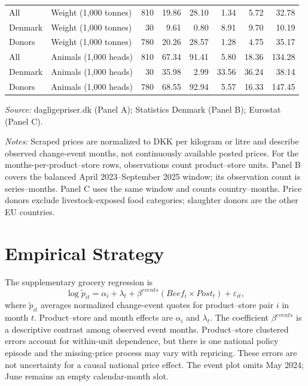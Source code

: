 \documentclass[11pt]{article}
\begin{document}
\begin{table}[htbp]
\begin{tabular}{llrrrrrr}
All & Weight (1,000 tonnes) & 810 & 19.86 & 28.10 & 1.34 & 5.72 & 32.78 \\
Denmark & Weight (1,000 tonnes) & 30 & 9.61 & 0.80 & 8.91 & 9.70 & 10.19 \\
Donors & Weight (1,000 tonnes) & 780 & 20.26 & 28.57 & 1.28 & 4.75 & 35.17 \\
All & Animals (1,000 heads) & 810 & 67.34 & 91.41 & 5.80 & 18.36 & 134.28 \\
Denmark & Animals (1,000 heads) & 30 & 35.98 & 2.99 & 33.56 & 36.24 & 38.14 \\
Donors & Animals (1,000 heads) & 780 & 68.55 & 92.94 & 5.57 & 16.33 & 147.45 \\\bottomrule
\end{tabular}
\begin{minipage}{0.98\linewidth}\small
\textit{Source:} dagligepriser.dk (Panel A); Statistics Denmark (Panel B); Eurostat (Panel C).\par
\textit{Notes:} Scraped prices are normalized to DKK per kilogram or litre and describe observed change-event months, not continuously available posted prices. For the months-per-product--store rows, observations count product--store units. Panel B covers the balanced April 2023--September 2025 window; its observation count is series--months. Panel C uses the same window and counts country--months. Price donors exclude livestock-exposed food categories; slaughter donors are the other EU countries.
\end{minipage}\end{table}

\section{Empirical Strategy}\label{sec:identification}
The supplementary grocery regression is
\begin{equation}\log \widetilde p_{it}=\alpha_i+\lambda_t+\beta^{events}(Beef_i\times Post_t)+\varepsilon_{it},\end{equation}
where $\widetilde p_{it}$ averages normalized change-event quotes for product--store pair $i$ in month $t$. Product--store and month effects are $\alpha_i$ and $\lambda_t$. The coefficient $\beta^{events}$ is a descriptive contrast among observed event months. Product--store clustered errors account for within-unit dependence, but there is one national policy episode and the missing-price process may vary with repricing. These errors are not uncertainty for a causal national price effect. The event plot omits May 2024; June remains an empty calendar-month slot.
\end{document}
